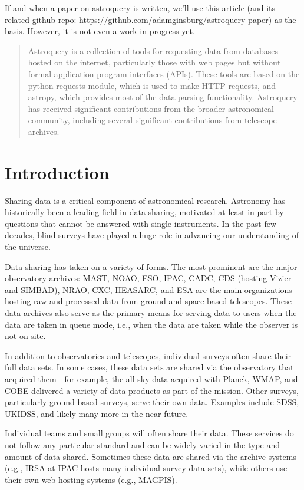 \documentclass{article}
\begin{document}
If and when a paper on astroquery is written, we'll use this article (and its
related github repo: https://github.com/adamginsburg/astroquery-paper) as the
basis.  However, it is not even a work in progress yet.

\begin{abstract}
Astroquery is a collection of tools for requesting data from databases hosted
on the internet, particularly those with web pages but without formal
application program interfaces (APIs).  These tools are based on the python
requests module, which is used to make HTTP requests, and astropy, which
provides most of the data parsing functionality.  Astroquery has received
significant contributions from the broader astronomical community, including
several significant contributions from telescope archives.
\end{abstract}

\section{Introduction}
Sharing data is a critical component of astronomical research.  Astronomy
has historically been a leading field in data sharing, motivated at least
in part by questions that cannot be answered with single instruments.
In the past few decades, blind surveys have played a huge role in advancing our
understanding of the universe.

Data sharing has taken on a variety of forms.  The most prominent are the major
observatory archives: MAST, NOAO, ESO, IPAC, CADC, CDS (hosting Vizier and
SIMBAD), NRAO, CXC, HEASARC, and ESA are the main
organizations hosting raw and processed data from ground and space based
telescopes.  These data archives also serve as the primary means for serving data
to users when the data are taken in queue mode, i.e., when the data are taken
while the observer is not on-site.

In addition to observatories and telescopes, individual surveys often share
their full data sets.  In some cases, these data sets are shared via the
observatory that acquired them - for example, the all-sky data acquired with
Planck, WMAP, and COBE delivered a variety of data products as part of the
mission.  Other surveys, particularly ground-based surveys, serve their own
data.  Examples include SDSS, UKIDSS, and likely many more in the near future.

Individual teams and small groups will often share their data.
These services do not follow any particular standard and can be widely
varied in the type and amount of data shared.  Sometimes these data
are shared via the archive systems (e.g., IRSA at IPAC hosts many
individual survey data sets), while others use their own web hosting
systems (e.g., MAGPIS).
\end{document}
